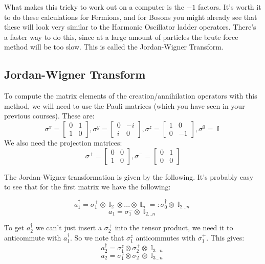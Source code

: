 \documentclass{article}
\DeclareMathOperator{\II}{\mathbb{I}}
\begin{document}
What makes this tricky to work out on a computer is the $-1$ factors. It's worth it to do these calculations for Fermions, and for Bosons you might already see that these will look very similar to the Harmonic Oscillator ladder operators. There's a faster way to do this, since at a large amount of particles the brute force method will be too slow. This is called the Jordan-Wigner Transform.
\subsection{Jordan-Wigner Transform}
To compute the matrix elements of the creation/annihilation operators with this method, we will need to use the Pauli matrices (which you have seen in your previous courses). These are:
\begin{equation}
\sigma^x = \begin{bmatrix}0&1\\1&0\end{bmatrix}, \sigma^y = \begin{bmatrix}0&-i\\i&0\end{bmatrix}, \sigma^z = \begin{bmatrix}1&0\\0&-1\end{bmatrix}, \sigma^0 = \II
\end{equation}
We also need the projection matrices:
\begin{equation}
\sigma^+ = \begin{bmatrix}0&0\\1&0\end{bmatrix}, \sigma^- = \begin{bmatrix}0&1\\0&0\end{bmatrix}
\end{equation}

The Jordan-Wigner transformation is given by the following. It's probably easy to see that for the first matrix we have the following:

\[a_1^\dagger = \sigma_1^+\otimes \II_2\otimes...\otimes\II_n =: \sigma_0^\dagger \otimes \II_{2...n}\]
\[a_1 = \sigma_1^- \otimes \II_{2...n}\]

To get $a_2^\dagger$ we can't just insert a $\sigma_2^+$ into the tensor product, we need it to anticommute with $a_1^\dagger$. So we note that $\sigma_1^z$ anticommutes with $\sigma_1^+$. This gives:
\[a_2^\dagger = \sigma_1^z \otimes \sigma_2^+\otimes \II_{3...n}\]
\[a_2 = \sigma_1^z\otimes \sigma_2^- \otimes \II_{3...n}\]
\end{document}
